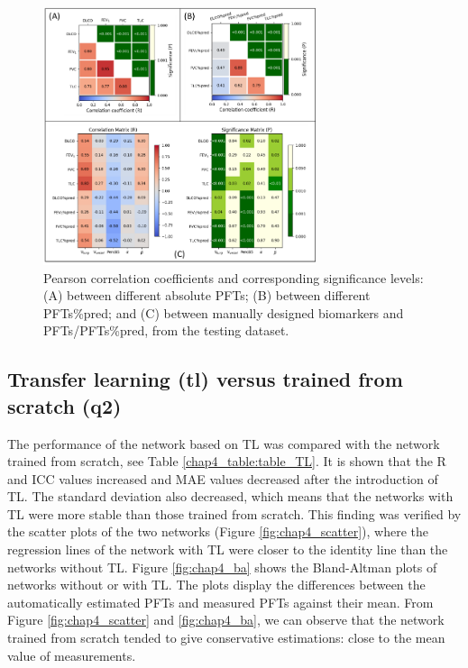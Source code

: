 \begin{figure}[tb]
    \centering
    \includegraphics[width=8cm]{manual_biomarkers.png}
    \caption{Pearson correlation coefficients and corresponding significance levels: (A) between different absolute PFTs; (B) between different PFTs\%pred; and (C) between manually designed biomarkers and PFTs/PFTs\%pred, from the testing dataset.}
    \label{fig:chap4_manual}
\end{figure}



\subsection{Transfer learning (tl) versus trained from scratch (q2)}
 
The performance of the network based on TL was compared with the network trained from scratch, see Table \ref{chap4_table:table_TL}. It is shown that the R and ICC values increased and MAE values decreased after the introduction of TL. The standard deviation also decreased, which means that the networks with TL were more stable than those trained from scratch. This finding was verified by the scatter plots of the two networks (Figure \ref{fig:chap4_scatter}), where the regression lines of the network with TL were closer to the identity line than the networks without TL. Figure \ref{fig:chap4_ba} shows the Bland-Altman plots of networks without or with TL. The plots display the differences between the automatically estimated PFTs and measured PFTs against their mean. From Figure \ref{fig:chap4_scatter} and \ref{fig:chap4_ba}, we can observe that the network trained from scratch tended to give conservative estimations: close to the mean value of measurements.


